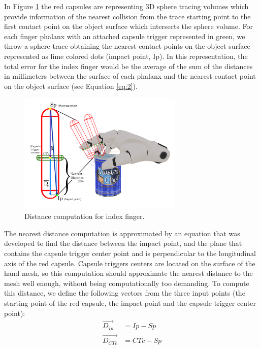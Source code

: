 In Figure \ref{fig:distanceCalculus} the red capsules are representing 3D sphere tracing volumes which provide information of the nearest collision from the trace starting point to the first contact point on the object surface which intersects the sphere volume. For each finger phalanx with an attached capsule trigger represented in green, we throw a sphere trace obtaining the nearest contact points on the object surface represented as lime colored dots (impact point, Ip). In this representation, the total error for the index finger would be the average of the sum of the distances in millimeters between the surface of each phalanx and the nearest contact point on the object surface (see Equation \ref{eq:2}).
\begin{figure}[!t]
	\centering
	\includegraphics[width=0.70\textwidth]{figures/unrealgrasp/distanceCalculusMod.png}
	\caption{Distance computation for index finger.}
	\label{fig:distanceCalculus}
\end{figure}
The nearest distance computation is approximated by an equation that was developed to find the distance between the impact point, and the plane that contains the capsule trigger center point and is perpendicular to the longitudinal axis of the red capsule. Capsule triggers centers are located on the surface of the hand mesh, so this computation should approximate the nearest distance to the mesh well enough, without being computationally too demanding. To compute this distance, we define the following vectors from the three input points (the starting point of the red capsule, the impact point and the capsule trigger center point):
\begin{equation} \label{eq:1aux1}
\begin{split}
\overrightarrow{D_{Ip}} &= Ip - Sp\\
\overrightarrow{D_{CTc}} &= CTc - Sp
\end{split}
\end{equation}  
